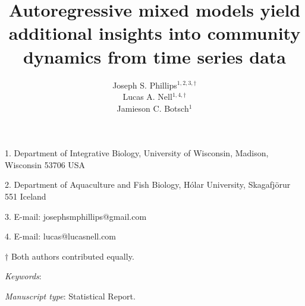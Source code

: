\documentclass[12pt]{article}
\title{Autoregressive mixed models yield additional insights into community dynamics
from time series data}
\author{
Joseph S. Phillips$^{1,2,3,\dagger}$ \\
Lucas A. Nell$^{1,4,\dagger}$ \\
Jamieson C. Botsch$^{1}$}
\date{}
\begin{document}
\maketitle


\noindent{} 1. Department of Integrative Biology, University of Wisconsin, Madison, Wisconsin 53706 USA

\noindent{} 2. Department of Aquaculture and Fish Biology, H\'{o}lar University, Skagafj\"{o}r{\dh}ur 551 Iceland

\noindent{} 3. E-mail: josephsmphillips@gmail.com

\noindent{} 4. E-mail: lucas@lucasnell.com

\noindent{} $\dagger$ Both authors contributed equally.



\bigskip


\bigskip


\textit{Keywords}: {
}


\bigskip

\textit{Manuscript type}: Statistical Report.


\linenumbers{}

\newpage{}





\newpage{}





\end{document}
